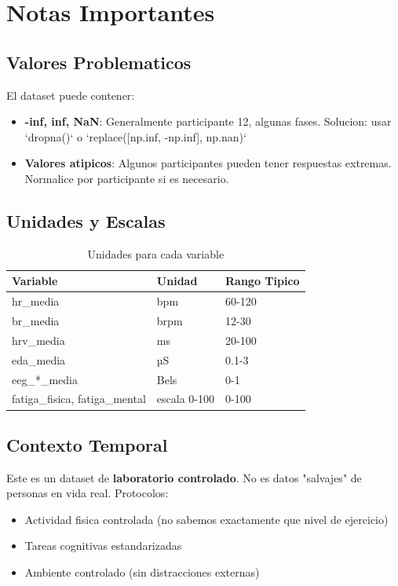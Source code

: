 \section{Notas Importantes}

\subsection{Valores Problematicos}

El dataset puede contener:
\begin{itemize}
    \item \textbf{-inf, inf, NaN}: Generalmente participante 12, algunas fases.
          Solucion: usar `dropna()` o `replace([np.inf, -np.inf], np.nan)`
    \item \textbf{Valores atipicos}: Algunos participantes pueden tener respuestas extremas.
          Normalice por participante si es necesario.
\end{itemize}

\subsection{Unidades y Escalas}

\begin{table}[H]
\centering
\caption{Unidades para cada variable}
\begin{tabular}{|l|l|l|}
\hline
\textbf{Variable} & \textbf{Unidad} & \textbf{Rango Tipico} \\
\hline
hr\_media & bpm & 60-120 \\
br\_media & brpm & 12-30 \\
hrv\_media & ms & 20-100 \\
eda\_media & µS & 0.1-3 \\
eeg\_*\_media & Bels & 0-1 \\
fatiga\_fisica, fatiga\_mental & escala 0-100 & 0-100 \\
\hline
\end{tabular}
\end{table}

\subsection{Contexto Temporal}

Este es un dataset de \textbf{laboratorio controlado}. No es datos "salvajes" de personas
en vida real. Protocolos:
\begin{itemize}
    \item Actividad fisica controlada (no sabemos exactamente que nivel de ejercicio)
    \item Tareas cognitivas estandarizadas
    \item Ambiente controlado (sin distracciones externas)
\end{itemize}


